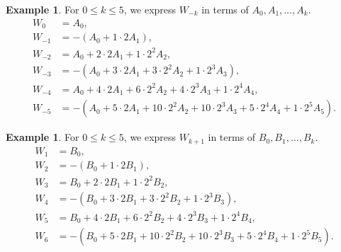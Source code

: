 \documentclass[11pt]{article}%
\theoremstyle{definition}
\newtheorem{example}[definition]{Example}
\theoremstyle{plain}
\begin{document}
\begin{example}\label{ex:tm_3rd_1st, Ak}
For $0 \leq k \leq 5$, we express $W_{-k}$  in terms of $A_0, A_1, \ldots, A_{k}$.
\begin{align*}
	W_0 & = A_0, \\[2pt]
	W_{-1} & = - (A_0 + 1 \cdot 2 A_1 ), \\[2pt]
	W_{-2} & =  A_0 + 2\cdot 2 A_1 + 1 \cdot 2^2 A_2, \\[2pt]
	W_{-3} & = -  ( A_0 + 3 \cdot 2 A_1 + 3 \cdot 2^2 A_2 + 1\cdot 2^3 A_3), \\[2pt]
	W_{-4} & = A_0 + 4 \cdot 2 A_1 + 6 \cdot 2^2 A_2 + 4 \cdot 2^3 A_3 + 1 \cdot 2^4 A_4, \\[2pt]
	W_{-5} & = -(A_0 + 5 \cdot 2 A_1 + 10 \cdot 2^2 A_2 + 10 \cdot 2^3 A_3 + 5 \cdot 2^4 A_4 + 1 \cdot 2^5 A_5).
\end{align*}
\end{example}

\begin{example}\label{ex:tm_3rd_1st, Bk}
For $0 \leq k \leq 5$, we express $W_{k+1}$ in terms of $B_0, B_1, \ldots, B_{k}$.
\begin{align*}
	W_1 & = B_0, \\[2pt]
	W_{2} & = - (B_0 + 1 \cdot 2 B_1 ), \\[2pt]
	W_{3} & =  B_0 + 2\cdot 2 B_1 + 1 \cdot 2^2 B_2, \\[2pt]
	W_{4} & = -  ( B_0 + 3 \cdot 2 B_1 + 3 \cdot 2^2 B_2 + 1\cdot 2^3 B_3), \\[2pt]
	W_{5} & = B_0 + 4 \cdot 2 B_1 + 6 \cdot 2^2 B_2 + 4 \cdot 2^3 B_3 + 1 \cdot 2^4 B_4, \\[2pt]
	W_{6} & = -(B_0 + 5 \cdot 2 B_1 + 10 \cdot 2^2 B_2 + 10 \cdot 2^3 B_3 + 5 \cdot 2^4 B_4 + 1 \cdot 2^5 B_5).
\end{align*}
\end{example}
\end{document}
